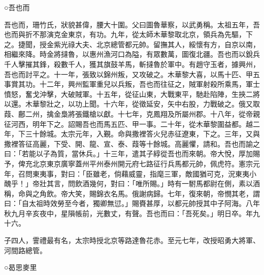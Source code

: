 \begin{pinyinscope}
 ○吾也而



 吾也而，珊竹氏，狀貌甚偉，腰大十圍。父曰圖魯華察，以武勇稱。太祖五年，吾也而與折不那演克金東京，有功。九年，從太師木華黎取北京，領兵為先驅，下之。捷聞，授金紫光祿大夫、北京總管都元帥。留撫其人，綏懷有方，自京以南，相繼來降。時金將撻魯，以惠州漁河口為隘，有眾數萬，圖復北疆。吾也而以銳兵千人擊摧其鋒，殺數千人，獲其旗鼓羊馬，斬撻魯於軍中。有趙守玉者，據興州，吾也而討平之。十一年，張致以錦州叛，又攻破之。木華黎大喜，以馬十匹、甲五事賞其功。十二年，興州監軍重兒以兵叛，吾也而往征之，賊軍射殺所乘馬，軍士憤怒，奮戈沖擊，大破賊軍。十五年，從征山東，大戰東平，馳赴陷陣，生挾二將以還。木華黎壯之，以功上聞。十六年，從徵延安，矢中右股，力戰破之。俄又取葭、鄜二州，擒金梟將張鐵槍以獻。十七年，克鳳翔及所屬州郡。十八年，從帝親征河西，明年下之。詔賜吾也而馬五匹、甲一事。二十年，從木華黎圍益都。越二年，下三十餘城。太宗元年，入覲。命與撒裡答火兒赤征遼東，下之。三年，又與撒裡答征高麗，下受、開、龍、宣、泰、葭等十餘城。高麗懼，請和。吾也而諭之曰：「若能以子為質，當休兵。」十三年，遣其子綧從吾也而來朝。帝大悅，厚加賜予，俾充北京東京廣寧蓋州平州泰州開元府七路征行兵馬都元帥，佩虎符。憲宗元年，召問東夷事，對曰：「臣雖老，倘藉威靈，指麾三軍，敵國猶可克，況東夷小醜乎！」帝壯其言，問飲酒幾何，對曰：「唯所賜。」時有一駙馬都尉在側，素以酒稱，命與之角飲。帝大笑，賜錦衣名馬。俄謝病歸。七年，復來朝，帝憫其老，謂曰：「自太祖時效勞至今者，獨卿無愆。」賜賚甚厚，以都元帥授其中子阿海。八年秋九月辛亥夜中，星隕帳前，光數丈，有聲。吾也而曰：「吾死矣。」明日卒。年九十六。



 子四人，霅禮最有名，太宗時授北京等路達魯花赤。至元七年，改授昭勇大將軍、河間路總管。



 ○曷思麥里




\end{pinyinscope}
